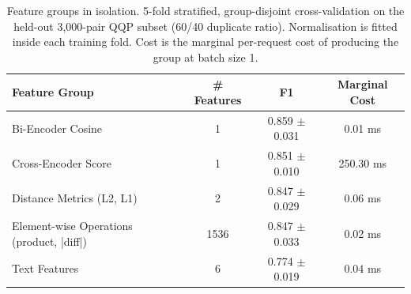 \begin{table}[htbp]
\centering
\caption{Feature groups in isolation. 5-fold stratified, group-disjoint cross-validation on the held-out 3,000-pair QQP subset (60/40 duplicate ratio). Normalisation is fitted inside each training fold. Cost is the marginal per-request cost of producing the group at batch size 1.}
\label{tab:ablation_isolation}
\begin{tabular}{lccc}
\toprule
\textbf{Feature Group} & \textbf{\# Features} & \textbf{F1} & \textbf{Marginal Cost} \\
\midrule
Bi-Encoder Cosine & 1 & 0.859 $\pm$ 0.031 & 0.01 ms \\
Cross-Encoder Score & 1 & 0.851 $\pm$ 0.010 & 250.30 ms \\
Distance Metrics (L2, L1) & 2 & 0.847 $\pm$ 0.029 & 0.06 ms \\
Element-wise Operations (product, |diff|) & 1536 & 0.847 $\pm$ 0.033 & 0.02 ms \\
Text Features & 6 & 0.774 $\pm$ 0.019 & 0.04 ms \\
\bottomrule
\end{tabular}
\end{table}
